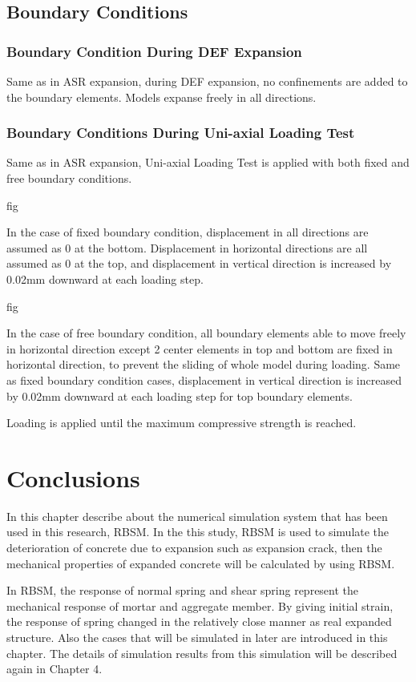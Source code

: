 \subsection{Boundary Conditions}

\subsubsection{Boundary Condition During DEF Expansion}

Same as in ASR expansion, during DEF expansion, no confinements are added to the boundary elements. Models expanse freely in all directions.

\subsubsection{Boundary Conditions During Uni-axial Loading Test}

Same as in ASR expansion, Uni-axial Loading Test is applied with both fixed and free boundary conditions.

fig

In the case of fixed boundary condition, displacement in all directions are assumed as 0 at the bottom. Displacement in horizontal directions are all assumed as 0 at the top, and displacement in vertical direction is increased by 0.02mm downward at each loading step.

fig

In the case of free boundary condition, all boundary elements able to move freely in horizontal direction except 2 center elements in top and bottom are fixed in horizontal direction, to prevent the sliding of whole model during loading. Same as fixed boundary condition cases, displacement in vertical direction is increased by 0.02mm downward at each loading step for top boundary elements.

Loading is applied until the maximum compressive strength is reached.


\section{Conclusions}

In this chapter describe about the numerical simulation system that has been used in this research, RBSM. In the this study, RBSM is used to simulate the deterioration of concrete due to expansion such as expansion crack, then the mechanical properties of expanded concrete will be calculated by using RBSM.

In RBSM, the response of normal spring and shear spring represent the mechanical response of mortar and aggregate member. By giving initial strain, the response of spring changed in the relatively close manner as real expanded structure. Also the cases that will be simulated in later are introduced in this chapter. The details of simulation results from this simulation will be described again in Chapter 4.
